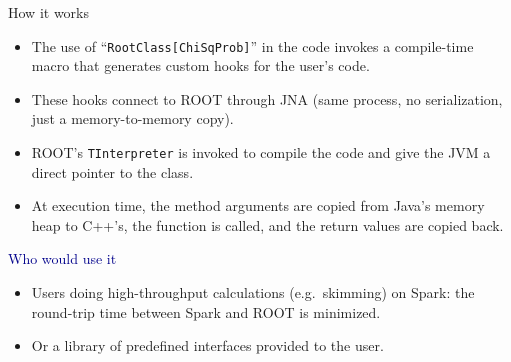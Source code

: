 \documentclass{beamer}
\begin{document}
\begin{frame}{How it works}
\begin{itemize}
\item The use of ``{\tt RootClass[ChiSqProb]}'' in the code invokes a compile-time macro that generates custom hooks for the user's code.
\item These hooks connect to ROOT through JNA (same process, no serialization, just a memory-to-memory copy).
\item ROOT's {\tt TInterpreter} is invoked to compile the code and give the JVM a direct pointer to the class.
\item At execution time, the method arguments are copied from Java's memory heap to C++'s, the function is called, and the return values are copied back.
\end{itemize}

\vfill
\hspace{-0.83 cm} \textcolor{darkblue}{\Large Who would use it}
\begin{itemize}
\item Users doing high-throughput calculations (e.g.\ skimming) on Spark: the round-trip time between Spark and ROOT is minimized.
\item Or a library of predefined interfaces provided to the user.
\end{itemize}
\end{frame}
\end{document}
